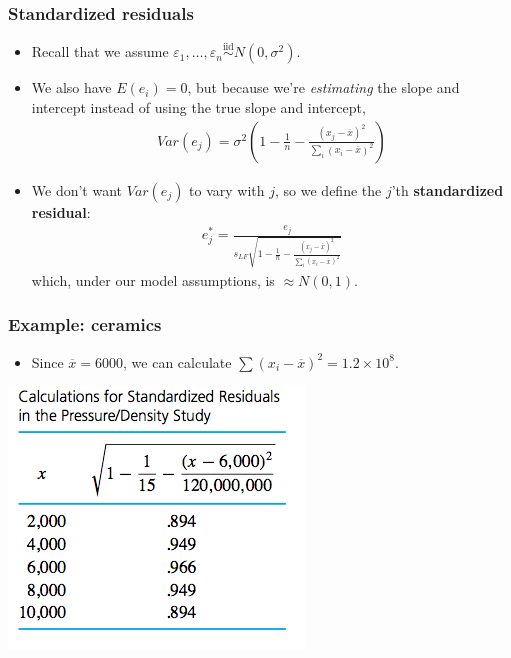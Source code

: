 \documentclass[handout]{beamer}\usepackage{graphicx, color}
\providecommand{\e}{\varepsilon}
\providecommand{\ov}[1]{\overline{#1}}
\numberwithin{equation}{section}
\begin{document}
\begin{frame}
\frametitle{Standardized residuals}
\begin{itemize}
\item Recall that we assume $\e_1, \ldots, \e_n \stackrel{\text{iid}}{\sim} N(0, \sigma^2)$.
\pause \item We also have $E(e_i) = 0$, but because we're \emph{estimating} the slope and intercept instead of using the true slope and intercept,
\pause \begin{align*}
Var(e_j) = \sigma^2 \left ( 1 - \frac{1}{n} - \frac{(x_j-\ov{x})^2}{ \sum_i (x_i - \ov{x})^2} \right )
\end{align*}
\pause \item We don't want $Var(e_j)$ to vary with $j$, so we define the $j$'th {\bf standardized residual}:
\pause \begin{align*}
e_j^* = \frac{e_j}{s_{LF}\sqrt{ 1 - \frac{1}{n} - \frac{(x_j-\ov{x})^2}{ \sum_i (x_i - \ov{x})^2} }}
\end{align*}
which, under our model assumptions, is $\approx N(0,1)$.
\end{itemize}
\end{frame}

\begin{frame}
\frametitle{Example: ceramics} \small
\begin{itemize}
\item Since $\ov{x} = 6000$, we can calculate $\sum(x_i - \ov{x})^2 = 1.2 \times 10^8$.
\end{itemize}
\begin{center}
 \includegraphics{../../fig/srescalc.png}
\end{center}
\end{frame}
\end{document}

